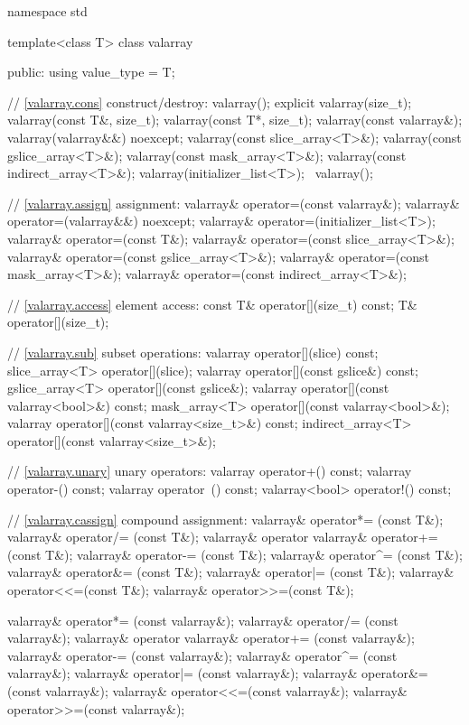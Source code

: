 %
\begin{codeblock}
namespace std {
  template<class T> class valarray {
  public:
    using value_type = T;

    // \ref{valarray.cons} construct/destroy:
    valarray();
    explicit valarray(size_t);
    valarray(const T&, size_t);
    valarray(const T*, size_t);
    valarray(const valarray&);
    valarray(valarray&&) noexcept;
    valarray(const slice_array<T>&);
    valarray(const gslice_array<T>&);
    valarray(const mask_array<T>&);
    valarray(const indirect_array<T>&);
    valarray(initializer_list<T>);
    ~valarray();

    // \ref{valarray.assign} assignment:
    valarray& operator=(const valarray&);
    valarray& operator=(valarray&&) noexcept;
    valarray& operator=(initializer_list<T>);
    valarray& operator=(const T&);
    valarray& operator=(const slice_array<T>&);
    valarray& operator=(const gslice_array<T>&);
    valarray& operator=(const mask_array<T>&);
    valarray& operator=(const indirect_array<T>&);

    // \ref{valarray.access} element access:
    const T&          operator[](size_t) const;
    T&                operator[](size_t);

    // \ref{valarray.sub} subset operations:
    valarray          operator[](slice) const;
    slice_array<T>    operator[](slice);
    valarray          operator[](const gslice&) const;
    gslice_array<T>   operator[](const gslice&);
    valarray          operator[](const valarray<bool>&) const;
    mask_array<T>     operator[](const valarray<bool>&);
    valarray          operator[](const valarray<size_t>&) const;
    indirect_array<T> operator[](const valarray<size_t>&);

    // \ref{valarray.unary} unary operators:
    valarray operator+() const;
    valarray operator-() const;
    valarray operator~() const;
    valarray<bool> operator!() const;

    // \ref{valarray.cassign} compound assignment:
    valarray& operator*= (const T&);
    valarray& operator/= (const T&);
    valarray& operator%
    valarray& operator+= (const T&);
    valarray& operator-= (const T&);
    valarray& operator^= (const T&);
    valarray& operator&= (const T&);
    valarray& operator|= (const T&);
    valarray& operator<<=(const T&);
    valarray& operator>>=(const T&);

    valarray& operator*= (const valarray&);
    valarray& operator/= (const valarray&);
    valarray& operator%
    valarray& operator+= (const valarray&);
    valarray& operator-= (const valarray&);
    valarray& operator^= (const valarray&);
    valarray& operator|= (const valarray&);
    valarray& operator&= (const valarray&);
    valarray& operator<<=(const valarray&);
    valarray& operator>>=(const valarray&);

}}
\end{codeblock}
